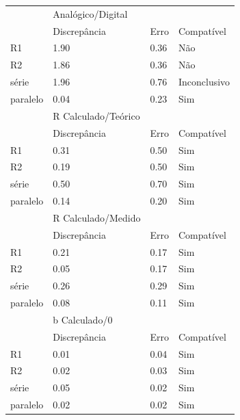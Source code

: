 \documentclass[11pt,a4paper]{article}
\begin{document}
\begin{table}[htb!]
\begin{tabular}{llll}
          \midrule
                   & Analógico/Digital &      &                                     \\
                   & Discrepância      & Erro & Compatível                          \\
          \midrule
          R1       & 1.90              & 0.36 & {\color[HTML]{CB0000} Não}          \\
          R2       & 1.86              & 0.36 & {\color[HTML]{CB0000} Não}          \\
          série    & 1.96              & 0.76 & {\color[HTML]{646809} Inconclusivo} \\
          paralelo & 0.04              & 0.23 & {\color[HTML]{009901} Sim}          \\ 
          \midrule
                   & R Calculado/Teórico &      &                                     \\
                   & Discrepância      & Erro & Compatível                          \\
          \midrule
          R1       & 0.31              & 0.50 & {\color[HTML]{009901} Sim}          \\
          R2       & 0.19              & 0.50 & {\color[HTML]{009901} Sim}          \\
          série    & 0.50              & 0.70 & {\color[HTML]{009901} Sim}          \\
          paralelo & 0.14              & 0.20 & {\color[HTML]{009901} Sim}          \\
          \midrule
                   & R Calculado/Medido &      &                                     \\
                   & Discrepância      & Erro & Compatível                          \\
          \midrule
          R1       & 0.21              & 0.17 & {\color[HTML]{009901} Sim}          \\
          R2       & 0.05              & 0.17 & {\color[HTML]{009901} Sim}          \\
          série    & 0.26              & 0.29 & {\color[HTML]{009901} Sim}          \\
          paralelo & 0.08              & 0.11 & {\color[HTML]{009901} Sim}          \\ 
          \midrule
                   & b Calculado/0     &      &                                     \\
                   & Discrepância      & Erro & Compatível                          \\
          \midrule
          R1       & 0.01              & 0.04 & {\color[HTML]{009901} Sim}          \\
          R2       & 0.02              & 0.03 & {\color[HTML]{009901} Sim}          \\
          série    & 0.05              & 0.02 & {\color[HTML]{009901} Sim}          \\
          paralelo & 0.02              & 0.02 & {\color[HTML]{009901} Sim}          \\ 
          \bottomrule
          

\end{tabular}
\end{table}
\end{document}
